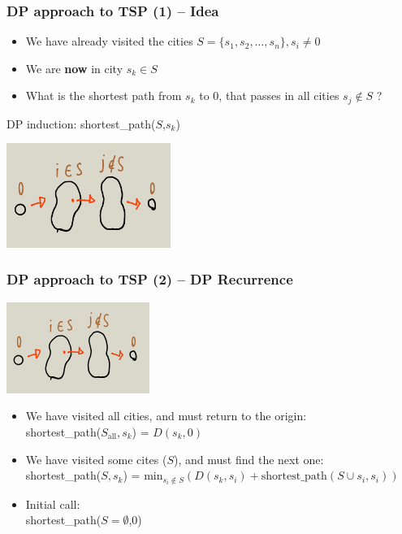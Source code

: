 \begin{frame}
  \frametitle{DP approach to TSP (1) -- Idea}
    \begin{block}{}
      \begin{itemize}
      \item We have already visited the cities $S = \{s_1,s_2,\ldots,s_n\}, s_i \neq 0$
      \item We are {\bf now} in city $s_k \in S$
      \item What is the shortest path from $s_k$ to $0$, that passes in all cities $s_j \notin S$ ?
      \end{itemize}

      DP induction: shortest\_path($S$,$s_k$)
    \end{block}
    \begin{center}
      \includegraphics[width=0.4\textwidth]{img/DP_TSP}
    \end{center}
\end{frame}

\begin{frame}
  \frametitle{DP approach to TSP (2) -- DP Recurrence}

  {\smaller
    \begin{center}
      \includegraphics[width=0.35\textwidth]{img/DP_TSP}
    \end{center}
    \begin{block}{}
      \begin{itemize}
      \item We have visited all cities, and must return to the origin:\\
        shortest\_path($S_{\text{all}},s_k$) = $D(s_k,0)$
      \item We have visited some cites ($S$), and must find the next one:\\
        shortest\_path($S,s_k$) = $\text{min}_{s_i\notin S}
        (D(s_k,s_i) + \text{shortest\_path}(S\cup s_i,s_i))$
      \item Initial call:\\
        shortest\_path($S = \emptyset$,0)
      \end{itemize}
    \end{block}
  }
\end{frame}

